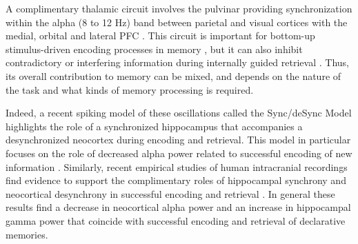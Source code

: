 \documentclass[11pt, titlepage, twoside]{article}
\begin{document}

A complimentary thalamic circuit involves the pulvinar providing synchronization within the alpha (8 to 12 Hz) band between parietal and visual cortices with the medial, orbital and lateral PFC \cite{BarbasHenionDermon91,KievitKuypers77,LopesdaSilva91}.  This circuit is important for bottom-up stimulus-driven encoding processes in memory \cite{JutrasFriesBuffalo13}, but it can also inhibit contradictory or interfering information during internally guided retrieval \cite{ParkLeeKangEtAl14}.  Thus, its overall contribution to memory can be mixed, and depends on the nature of the task and what kinds of memory processing is required.



Indeed, a recent spiking model of these oscillations called the Sync/deSync Model highlights the role of a synchronized hippocampus that accompanies a desynchronized neocortex during encoding and retrieval.  This model in particular focuses on the role of decreased alpha power related to successful encoding of new information \cite{ParishHanslmayrBowman18, HanslmayrStaresinaBowman16}.  Similarly, recent empirical studies of human intracranial recordings find evidence to support the complimentary roles of hippocampal synchrony and neocortical desynchrony in successful encoding and retrieval \cite{GriffithsMichelmannRouxEtAl18, StaresinaMichelmannBonnefondEtAl16}.  In general these results find a decrease in neocortical alpha power and an increase in hippocampal gamma power that coincide with successful encoding and retrieval of declarative memories. 
\end{document}
